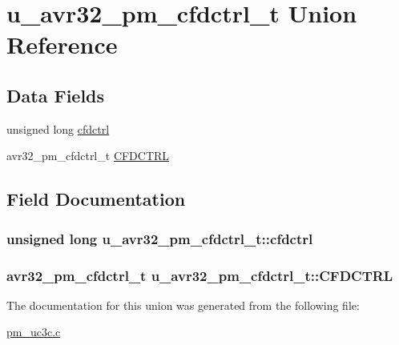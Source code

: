 \hypertarget{unionu__avr32__pm__cfdctrl__t}{
\section{u\-\_\-avr32\-\_\-pm\-\_\-cfdctrl\-\_\-t \-Union \-Reference}
\label{unionu__avr32__pm__cfdctrl__t}
}
\subsection*{\-Data \-Fields}
\begin{DoxyCompactItemize}
\item 
unsigned long \hyperlink{unionu__avr32__pm__cfdctrl__t_a11c58f931eebbce6605378fa22e43f5b}{cfdctrl}
\item 
avr32\-\_\-pm\-\_\-cfdctrl\-\_\-t \hyperlink{unionu__avr32__pm__cfdctrl__t_a6d88c95cdc744077c420cde38d043fd6}{\-C\-F\-D\-C\-T\-R\-L}
\end{DoxyCompactItemize}


\subsection{\-Field \-Documentation}
\hypertarget{unionu__avr32__pm__cfdctrl__t_a11c58f931eebbce6605378fa22e43f5b}{
\subsubsection[{cfdctrl}]{\setlength{\rightskip}{0pt plus 5cm}unsigned long {\bf u\-\_\-avr32\-\_\-pm\-\_\-cfdctrl\-\_\-t\-::cfdctrl}}}
\label{unionu__avr32__pm__cfdctrl__t_a11c58f931eebbce6605378fa22e43f5b}
\hypertarget{unionu__avr32__pm__cfdctrl__t_a6d88c95cdc744077c420cde38d043fd6}{
\subsubsection[{\-C\-F\-D\-C\-T\-R\-L}]{\setlength{\rightskip}{0pt plus 5cm}avr32\-\_\-pm\-\_\-cfdctrl\-\_\-t {\bf u\-\_\-avr32\-\_\-pm\-\_\-cfdctrl\-\_\-t\-::\-C\-F\-D\-C\-T\-R\-L}}}
\label{unionu__avr32__pm__cfdctrl__t_a6d88c95cdc744077c420cde38d043fd6}


\-The documentation for this union was generated from the following file\-:\begin{DoxyCompactItemize}
\item 
\hyperlink{pm__uc3c_8c}{pm\-\_\-uc3c.\-c}\end{DoxyCompactItemize}
